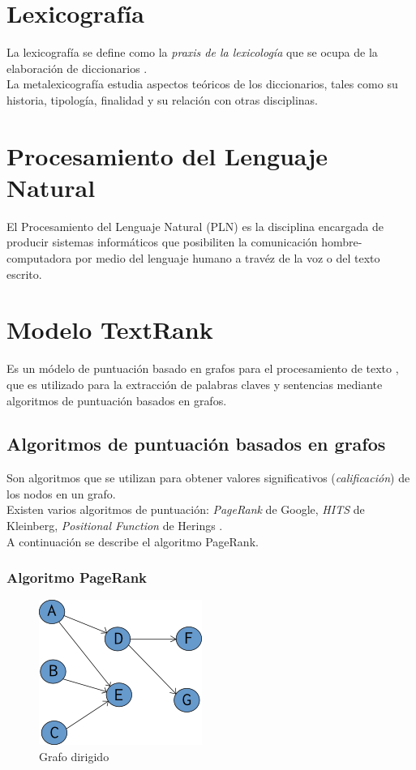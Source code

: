\section{Lexicograf\'ia}
La lexicograf\'ia se define como la \emph{praxis de la lexicolog\'ia} que se ocupa
de la elaboraci\'on de diccionarios \cite{LEX01}. \\

La metalexicograf\'ia estudia aspectos te\'oricos de los diccionarios, tales como
su historia, tipolog\'ia, finalidad y su relaci\'on con otras disciplinas. \\

\section{Procesamiento del Lenguaje Natural}
El Procesamiento del Lenguaje Natural (PLN) es la disciplina encargada
de producir sistemas inform\'aticos que posibiliten la comunicaci\'on
hombre-computadora por medio del lenguaje humano a trav\'ez de la voz o
del texto escrito.

\section{Modelo TextRank}
Es un m\'odelo de puntuaci\'on basado en grafos para el procesamiento de
texto \cite{RMPT04}, que es utilizado para la extracci\'on de palabras claves
y sentencias mediante algoritmos de puntuaci\'on basados en grafos.

\subsection{Algoritmos de puntuaci\'on basados en grafos}
Son algoritmos que se utilizan para obtener valores significativos
(\emph{calificaci\'on}) de los nodos en un grafo. \\

Existen varios algoritmos de puntuaci\'on: \emph{PageRank} de Google,
\emph{HITS} de Kleinberg, \emph{Positional Function} de Herings \cite{RM04}. \\

A continuaci\'on se describe el algoritmo PageRank.

\subsubsection{Algoritmo PageRank}
\begin{figure}
	\centering
		\includegraphics[]{recursos/img/grafoDirigido}
		\caption {Grafo dirigido}
\end{figure}

